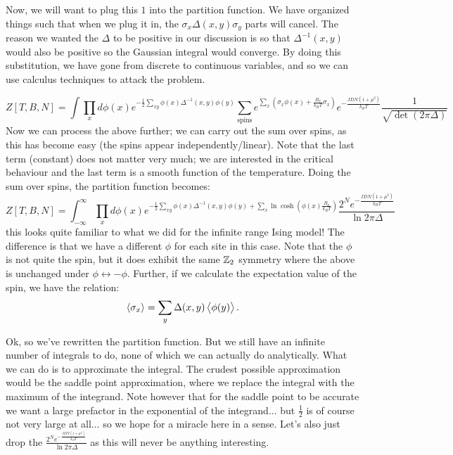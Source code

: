 Now, we will want to plug this $1$ into the partition function. We have organized things such that when we plug it in, the $\sigma_x\Delta(x, y)\sigma_y$ parts will cancel. The reason we wanted the $\Delta$ to be positive in our discussion is so that $\Delta^{-1}(x, y)$ would also be positive so the Gaussian integral would converge. By doing this substitution, we have gone from discrete to continuous variables, and so we can use calculus techniques to attack the problem.

\begin{equation}
    Z[T, B, N] = \int \prod_x d\phi(x) e^{-\frac{1}{2}\sum_{xy}\phi(x)\Delta^{-1}(x, y)\phi(y)}\sum_{\text{spins}}e^{\sum_x\left(\sigma_x\phi(x) + \frac{B_x}{k_B T}\sigma_x\right)}e^{-\frac{JDN(1+\mu^2)}{k_B T}}\frac{1}{\sqrt{\det(2\pi\Delta)}}
\end{equation}
Now we can process the above further; we can carry out the sum over spins, as this has become easy (the spins appear independently/linear). Note that the last term (constant) does not matter very much; we are interested in the critical behaviour and the last term is a smooth function of the temperature. Doing the sum over spins, the partition function becomes:
\begin{equation}
    Z[T, B, N] = \int_{-\infty}^\infty \prod_x d\phi(x) e^{-\frac{1}{2}\sum_{xy}\phi(x)\Delta^{-1}(x, y)\phi(y) + \sum_x \ln\cosh(\phi(x)\frac{B_x}{k_B T})}\frac{2^Ne^{-\frac{JDN(1+\mu^2)}{k_B T}}}{\ln 2\pi \Delta}
\end{equation}
this looks quite familiar to what we did for the infinite range Ising model! The difference is that we have a different $\phi$ for each site in this case. Note that the $\phi$ is not quite the spin, but it does exhibit the same $\mathbb{Z}_2$ symmetry where the above is unchanged under $\phi \leftrightarrow -\phi$. Further, if we calculate the expectation value of the spin, we have the relation:
\begin{equation}
    \avg{\sigma_x} = \sum_y \Delta(x, y)\avg{\phi(y)}.
\end{equation}

Ok, so we've rewritten the partition function. But we still have an infinite number of integrals to do, none of which we can actually do analytically. What we can do is to approximate the integral. The crudest possible approximation would be the saddle point approximation, where we replace the integral with the maximum of the integrand. Note however that for the saddle point to be accurate we want a large prefactor in the exponential of the integrand... but $\frac{1}{2}$ is of course not very large at all... so we hope for a miracle here in a sense. Let's also just drop the $\frac{2^Ne^{-\frac{JDN(1+\mu^2)}{k_B T}}}{\ln 2\pi \Delta}$ as this will never be anything interesting.

